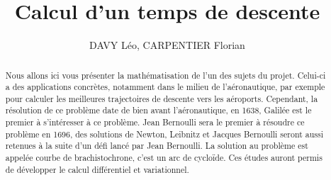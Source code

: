 \documentclass[a4paper,10pt]{article}
\title{Calcul d'un temps de descente}
\author{DAVY Léo, CARPENTIER Florian}
\begin{document}
\maketitle
\newtheorem{theorem}{Theor\`eme}
\begin{abstract}
Nous allons ici vous pr\'esenter la math\'ematisation de l'un des sujets du projet. Celui-ci a des applications concr\`etes, notamment dans le milieu de l'a\'eronautique, par exemple
pour calculer les meilleures trajectoires de descente vers les aéroports. Cependant, la résolution de ce probl\`eme date de bien avant l'a\'eronautique, en 1638, Galil\'ee est le premier \`a s'int\'eresser
\`a ce probl\`eme. Jean Bernoulli sera le premier \`a r\'esoudre ce probl\`eme en 1696, des solutions de Newton, Leibnitz et Jacques Bernoulli seront aussi retenues \`a la suite d'un d\'efi lanc\'e
par Jean Bernoulli. La solution au probl\`eme est appel\'ee courbe de brachistochrone, c'est un arc de cycloïde. Ces \'etudes auront permis de d\'evelopper le calcul diff\'erentiel et variationnel.
\end{abstract}
\end{document}
